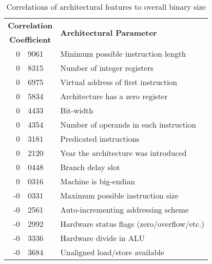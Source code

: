 
\begin{table}[tbp]
\caption{Correlations of architectural features to overall binary size}
\label{table:overall_correlations}
\begin{sf} 
\begin{center}
\begin{tabular}{|r@{.\hspace{0.025em}}l|l|}
\hline
\multicolumn{2}{|c|}{\bf Correlation} & \multirow{2}{*}{\bf Architectural Parameter}\\
\multicolumn{2}{|c|}{\bf Coefficient} & \\
\hline
\hline
 0 & 9061	& Minimum possible instruction length \\
 0 & 8315	& Number of integer registers \\
 0 & 6975	& Virtual address of first instruction \\ 
 0 & 5834	& Architecture has a zero register \\
 0 & 4433	& Bit-width \\
 0 & 4354	& Number of operands in each instruction \\
 0 & 3181	& Predicated instructions \\
 0 & 2120	& Year the architecture was introduced \\
 0 & 0448	& Branch delay slot \\
 0 & 0316	& Machine is big-endian \\
 \hline
-0 & 0331	& Maximum possible instruction size  \\
-0 & 2561	& Auto-incrementing addressing scheme \\
-0 & 2992	& Hardware status flags (zero/overflow/etc.) \\
-0 & 3336	& Hardware divide in ALU \\
-0 & 3684	& Unaligned load/store available \\
\hline
\end{tabular}
\end{center}
\end{sf}
 

%
\end{table}



